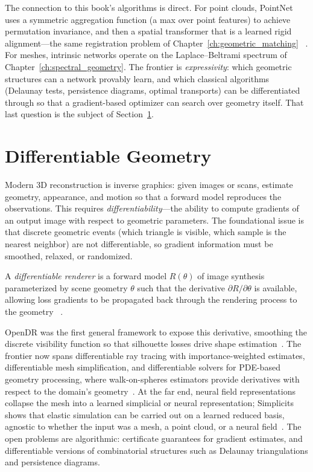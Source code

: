 The connection to this book's algorithms is direct. For point clouds, PointNet
uses a symmetric aggregation function (a max over point features) to achieve
permutation invariance, and then a spatial transformer that is a learned rigid
alignment---the same registration problem of Chapter~\ref{ch:geometric_matching}
~\cite{qi2017pointnet}. For meshes, intrinsic networks operate on the
Laplace--Beltrami spectrum of Chapter~\ref{ch:spectral_geometry}. The frontier
is \emph{expressivity}: which geometric structures can a network provably
learn, and which classical algorithms (Delaunay tests, persistence diagrams,
optimal transports) can be differentiated through so that a gradient-based
optimizer can search over geometry itself. That last question is the subject of
Section~\ref{sec:frontiers_differentiable}.

\section{Differentiable Geometry}
\label{sec:frontiers_differentiable}

Modern 3D
reconstruction is inverse graphics: given images or scans, estimate geometry,
appearance, and motion so that a forward model reproduces the observations.
This requires \emph{differentiability}---the ability to compute gradients of an
output image with respect to geometric parameters. The foundational issue is
that discrete geometric events (which triangle is visible, which sample is the
nearest neighbor) are not differentiable, so gradient information must be
smoothed, relaxed, or randomized.

\begin{definition}\label{def:frontiers_diff_renderer}
A \emph{differentiable renderer} is a forward model $R(\theta)$ of image
synthesis parameterized by scene geometry $\theta$ such that the derivative
$\partial R / \partial \theta$ is available, allowing loss gradients to be
propagated back through the rendering process to the geometry
~\cite{loper2014opendr}.
\end{definition}

OpenDR was the first general framework to expose this derivative, smoothing
the discrete visibility function so that silhouette losses drive shape
estimation~\cite{loper2014opendr}. The frontier now spans differentiable ray
tracing with importance-weighted estimates, differentiable mesh simplification,
and differentiable solvers for PDE-based geometry processing, where
walk-on-spheres estimators provide derivatives with respect to the domain's
geometry~\cite{yu2025}. At the far end, neural field representations collapse
the mesh into a learned simplicial or neural representation; Simplicits shows
that elastic simulation can be carried out on a learned reduced basis, agnostic
to whether the input was a mesh, a point cloud, or a neural
field~\cite{modi2024simplicits}. The open problems are algorithmic: certificate
guarantees for gradient estimates, and differentiable versions of combinatorial
structures such as Delaunay triangulations and persistence diagrams.

